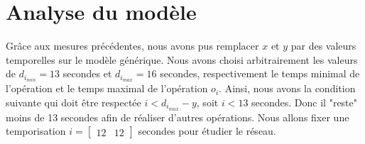 \section{Analyse du modèle}
Grâce aux mesures précédentes, nous avons pus remplacer $x$ et $y$ par des valeurs temporelles sur le modèle générique. Nous avons choisi arbitrairement les valeurs de $d_{i_{min}} = 13$ secondes et $d_{i_{max}} = 16$ secondes, respectivement le temps minimal de l'opération et le temps maximal de l'opération $o_i$.  Ainsi, nous avons la condition suivante qui doit être respectée $i <d_{i_{max}}-y$, soit $i < 13$ secondes. Donc il "reste" moins de 13 secondes afin de réaliser d'autres opérations. Nous allons fixer une temporisation  $i=\begin{bmatrix}
12& 12
\end{bmatrix}$ secondes pour étudier le réseau. 

